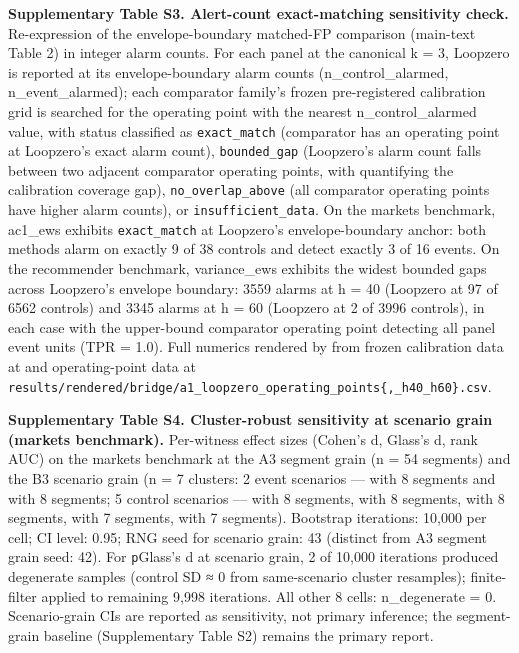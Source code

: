 \documentclass[
  11pt,
]{article}
\begin{document}
\textbf{Supplementary Table S3. Alert-count exact-matching sensitivity
check.} Re-expression of the envelope-boundary matched-FP comparison
(main-text Table 2) in integer alarm counts. For each panel at the
canonical k = 3, Loopzero is reported at its envelope-boundary alarm
counts (n\_control\_alarmed, n\_event\_alarmed); each comparator
family's frozen pre-registered calibration grid is searched for the
operating point with the nearest n\_control\_alarmed value, with status
classified as \texttt{exact\_match} (comparator has an operating point
at Loopzero's exact alarm count), \texttt{bounded\_gap} (Loopzero's
alarm count falls between two adjacent comparator operating points, with
\texttt{} quantifying the calibration coverage
gap), \texttt{no\_overlap\_above} (all comparator operating points have
higher alarm counts), or \texttt{insufficient\_data}. On the markets
benchmark, ac1\_ews exhibits \texttt{exact\_match} at Loopzero's
envelope-boundary anchor: both methods alarm on exactly 9 of 38 controls
and detect exactly 3 of 16 events. On the recommender benchmark,
variance\_ews exhibits the widest bounded gaps across Loopzero's
envelope boundary: 3559 alarms at h = 40 (Loopzero at 97 of 6562
controls) and 3345 alarms at h = 60 (Loopzero at 2 of 3996 controls), in
each case with the upper-bound comparator operating point detecting all
panel event units (TPR = 1.0). Full numerics rendered by
\texttt{} from frozen
calibration data at
\texttt{} and
operating-point data at
\texttt{results/rendered/bridge/a1\_loopzero\_operating\_points\{,\_h40\_h60\}.csv}.

\textbf{Supplementary Table S4. Cluster-robust sensitivity at scenario
grain (markets benchmark).} Per-witness effect sizes (Cohen's d, Glass's
d, rank AUC) on the markets benchmark at the A3 segment grain (n = 54
segments) and the B3 scenario grain (n = 7 clusters: 2 event scenarios
--- \texttt{} with 8 segments and
\texttt{} with 8 segments; 5 control scenarios
--- \texttt{} with 8 segments,
\texttt{} with 8 segments,
\texttt{} with 8 segments,
\texttt{} with 7 segments,
\texttt{} with 7 segments). Bootstrap
iterations: 10,000 per cell; CI level: 0.95; RNG seed for scenario
grain: 43 (distinct from A3 segment grain seed: 42). For
\texttt{p}\textbar Glass's d at scenario grain, 2 of 10,000 iterations
produced degenerate samples (control SD ≈ 0 from same-scenario cluster
resamples); finite-filter applied to remaining 9,998 iterations. All
other 8 cells: n\_degenerate = 0. Scenario-grain CIs are reported as
sensitivity, not primary inference; the segment-grain baseline
(Supplementary Table S2) remains the primary report.
\end{document}
